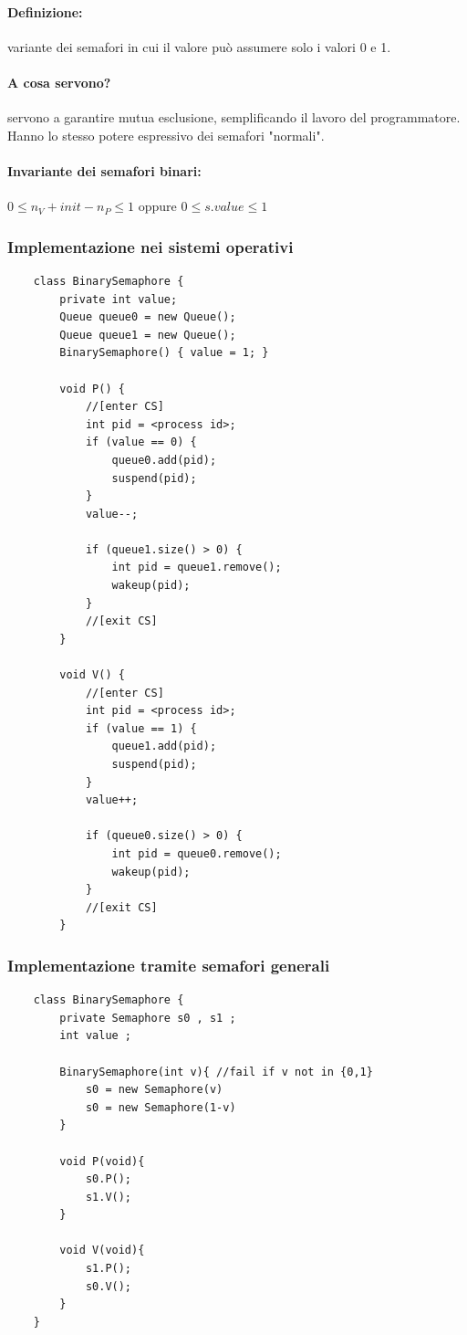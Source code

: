 \paragraph{Definizione:}variante dei semafori in cui il valore può assumere solo i valori 0 e 1.

\paragraph{A cosa servono?}servono a garantire mutua esclusione, semplificando il lavoro del programmatore.
Hanno lo stesso potere espressivo dei semafori "normali".

\paragraph{Invariante dei semafori binari:}
$0 \leq n_V + init - n_P \leq 1$ oppure $0 \leq s.value \leq 1$
\newpage

\subsubsection{Implementazione nei sistemi operativi}
\begin{lstlisting}
    class BinarySemaphore {
        private int value;
        Queue queue0 = new Queue();
        Queue queue1 = new Queue();
        BinarySemaphore() { value = 1; }

        void P() {
            //[enter CS]
            int pid = <process id>;
            if (value == 0) {
                queue0.add(pid);
                suspend(pid);
            }
            value--;
        
            if (queue1.size() > 0) {
                int pid = queue1.remove();
                wakeup(pid);
            }
            //[exit CS]
        }

        void V() {
            //[enter CS]
            int pid = <process id>;
            if (value == 1) {
                queue1.add(pid);
                suspend(pid);
            }
            value++;
            
            if (queue0.size() > 0) {
                int pid = queue0.remove();
                wakeup(pid);
            }
            //[exit CS]
        }
\end{lstlisting}

\subsubsection{Implementazione tramite semafori generali}
\begin{lstlisting}
    class BinarySemaphore {
        private Semaphore s0 , s1 ;
        int value ;

        BinarySemaphore(int v){ //fail if v not in {0,1}
            s0 = new Semaphore(v)
            s0 = new Semaphore(1-v)
        }
        
        void P(void){
            s0.P();
            s1.V();
        }

        void V(void){
            s1.P();
            s0.V();
        }
    }
\end{lstlisting}

